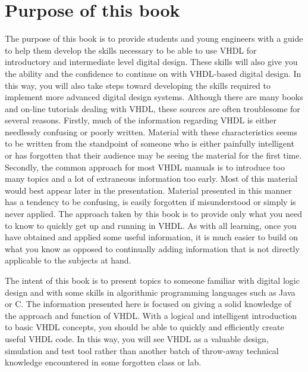 %
%
{} %
\chapter*{Purpose of this book}
The purpose of this book is to provide students and young engineers with a guide to help them develop the skills necessary to be able to use VHDL for introductory and intermediate level digital design. These skills will also give you the ability and the confidence to continue on with VHDL-based digital design. In this way, you will also take steps toward developing the skills required to implement more advanced digital design systems.
Although there are many books and on-line tutorials dealing with VHDL, these sources are often troublesome for several reasons. Firstly, much of the information regarding VHDL is either needlessly confusing or poorly written. Material with these characteristics seems to be written from the standpoint of someone who is either painfully intelligent or has forgotten that their audience may be seeing the material for the first time. Secondly, the common approach for most VHDL manuals is to introduce too many topics and a lot of extraneous information too early. Most of this material would best appear later in the presentation. Material presented in this manner has a tendency to be confusing, is easily forgotten if misunderstood or simply is never applied. The approach taken by this book is to provide only what you need to know to quickly get up and running in VHDL. As with all learning, once you have obtained and applied some useful information, it is much easier to build on what you know as opposed to continually adding information that is not directly applicable to the subjects at hand.

The intent of this book is to present topics to someone familiar with digital logic design and with some skills in algorithmic programming languages such as Java or C. The information presented here is focused on giving a solid knowledge of the approach and function of VHDL. With a logical and intelligent introduction to basic VHDL concepts, you should be able to quickly and efficiently create useful VHDL code. In this way, you will see VHDL as a valuable design, simulation and test tool rather than another batch of throw-away technical knowledge encountered in some forgotten class or lab.

